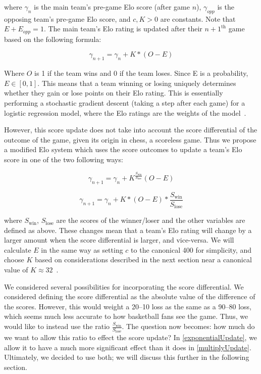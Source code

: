 \documentclass{article}
\begin{document}
where $\gamma_n$ is the main team's pre-game Elo score (after game $n$), $\gamma_{opp}$ is the opposing team's pre-game Elo score, and $c, K > 0$ are constants. Note that $E + E_{opp} = 1$. The main team's Elo rating is updated after their $n+1^{\text{th}}$ game based on the following formula:

\begin{equation}
\gamma_{n+1} = \gamma_n + K*(O - E)
\end{equation}


Where $O$ is 1 if the team wins and 0 if the team loses. Since E is a probability,  $E \in [0, 1]$. This means that a team winning or losing uniquely determines whether they gain or lose points on their Elo rating. This is essentially performing a stochastic gradient descent (taking a step after each game) for a logistic regression model, where the Elo ratings are the weights of the model~\cite{stmorseStatisticalLearning}.

However, this score update does not take into account the score differential of the outcome of the game, given its origin in chess, a scoreless game. Thus we propose a modified Elo system which uses the score outcomes to update a team's Elo score in one of the two following ways: 

\begin{equation}
\label{exponentialUpdate}
\gamma_{n+1} = \gamma_n + K^{\frac{S_{\text{win}}}{S_{\text{lose}}}}(O - E)
\end{equation}


\begin{equation}
\label{multiplyUpdate}
\gamma_{n+1} = \gamma_n + K*(O - E)*\frac{S_{\text{win}}}{S_{\text{lose}}}
\end{equation}


where $S_{\text{win}}$, $S_{\text{lose}}$ are the scores of the winner/loser and the other variables are defined as above. These changes mean that a team's Elo rating will change by a larger amount when the score differential is larger, and vice-versa. We will calculate $E$ in the same way as setting $c$ to the canonical 400 for simplicity, and choose $K$ based on considerations described in the next section near a canonical value  of $K\approx 32$~\cite{mediumRatingSystem}.

We considered several possibilities for incorporating the score differential. We considered defining the score differential as the absolute value of the difference of the scores. However, this would weight a 20--10 loss as the same as a 90--80 loss, which seems much less accurate to how basketball fans see the game. Thus, we would like to instead use the ratio $\frac{S_{\text{win}}}{S_{\text{lose}}}$. The question now becomes: how much do we want to allow this ratio to effect the score update? In \autoref{exponentialUpdate}, we allow it to have a much more significant effect than it does in \autoref{multiplyUpdate}. Ultimately, we decided to use both; we will discuss this further in the following section.
\end{document}
